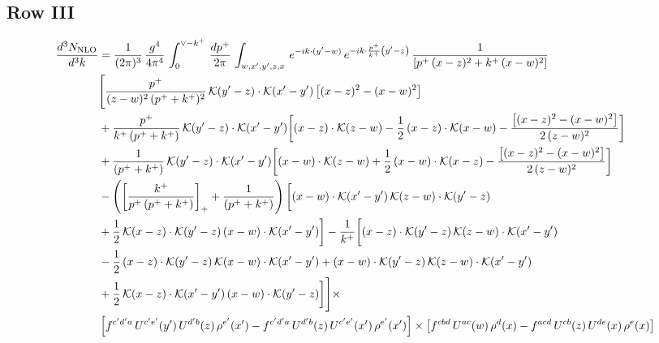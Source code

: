 \documentclass[9pt]{article}
\numberwithin{equation}{section}
\begin{document}
\subsection{Row III}
\begin{align}
 \frac{d^{3}N_{\rm NLO}}{d^{3}k} & =  \frac{1}{(2\pi)^{3}}\,\frac{g^{4}}{4\pi^{4}}\,\int_{0}^{\vee-k^{+}}\, \frac{dp^{+}}{2\pi}\,\int_{w,x',y',z,x}\, e^{-ik\cdot (y'-w)}\,e^{-ik\cdot \frac{p^{+}}{k^{+}}\left(y'-z\right)}\, \frac{1}{\left[p^{+}\,(x-z)^{2}+k^{+}\,(x-w)^{2}\right]}\notag \\ & \Bigg[\frac{p^{+}}{(z-w)^{2}\,(p^{+}+k^{+})^{2}}\,\mathcal{K}(y'-z)\cdot\mathcal{K}(x'-y')\left[(x-z)^{2}-(x-w)^{2}\right]\notag \\ & +\frac{p^{+}}{k^{+}\,(p^{+}+k^{+})}\,\mathcal{K}(y'-z)\cdot\mathcal{K}(x'-y')\bigg[(x-z)\cdot\mathcal{K}(z-w)-\frac{1}{2}\,(x-z)\cdot\mathcal{K}(x-w)-\frac{\left[(x-z)^{2}-(x-w)^{2}\right]}{2\,(z-w)^{2}}\bigg]\notag \\ & +\frac{1}{(p^{+}+k^{+})}\,\mathcal{K}(y'-z)\cdot\mathcal{K}(x'-y')\bigg[(x-w)\cdot\mathcal{K}(z-w)+\frac{1}{2}\,(x-w)\cdot\mathcal{K}(x-z)-\frac{\left[(x-z)^{2}-(x-w)^{2}\right]}{2\,(z-w)^{2}}\bigg]\notag \\ & -\left(\left[\frac{k^{+}}{p^{+}\,(p^{+}+k^{+})}\right]_{+}+\frac{1}{(p^{+}+k^{+})}\right)\bigg[(x-w)\cdot\mathcal{K}(x'-y')\,\mathcal{K}(z-w)\cdot\mathcal{K}(y'-z)\notag \\ & +\frac{1}{2}\,\mathcal{K}(x-z)\cdot\mathcal{K}(y'-z)\,(x-w)\cdot\mathcal{K}(x'-y')\bigg] -\frac{1}{k^{+}}\bigg[(x-z)\cdot\mathcal{K}(y'-z)\,\mathcal{K}(z-w)\cdot\mathcal{K}(x'-y')\notag \\ & -\frac{1}{2}\,(x-z)\cdot\mathcal{K}(y'-z)\,\mathcal{K}(x-w)\cdot\mathcal{K}(x'-y')+(x-w)\cdot\mathcal{K}(y'-z)\,\mathcal{K}(z-w)\cdot\mathcal{K}(x'-y')\notag \\ & +\frac{1}{2}\,\mathcal{K}(x-z)\cdot\mathcal{K}(x'-y')\,(x-w)\cdot\mathcal{K}(y'-z)\bigg]\Bigg] \times\notag \\ & \left[f^{c'd'a}\,U^{c'e'}(y')\,U^{d'b}(z)\,\rho^{e'}(x')-f^{c'd'a}\, U^{d'b}(z)\,U^{c'e'}(x')\,\rho^{e'}(x')\right] \times\left[f^{cbd}\,U^{ac}(w)\,\rho^{d}(x) -f^{acd}\,U^{cb}(z)\,U^{de}(x)\,\rho^{e}(x)\right] \notag \\

\end{align}
\end{document}

